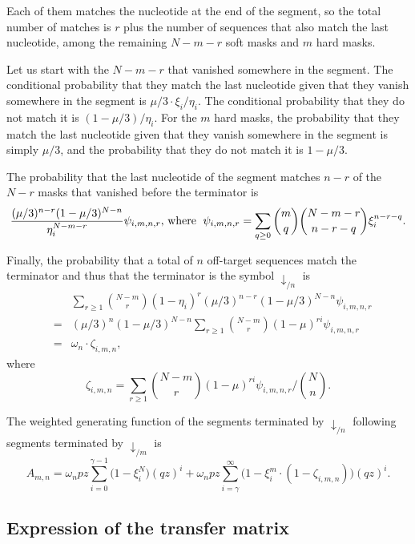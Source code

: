 \documentclass{article}
\begin{document}
Each of them matches the nucleotide at the end of the segment, so the
total number of matches is $r$ plus the number of sequences that also
match the last nucleotide, among the remaining $N-m-r$ soft masks and $m$
hard masks.

Let us start with the $N-m-r$ that vanished somewhere in the segment. The
conditional probability that they match the last nucleotide given that
they vanish somewhere in the segment is $\mu/3 \cdot \xi_i / \eta_i$. The
conditional probability that they do not match it is $(1-\mu/3) / \eta_i$.
For the $m$ hard masks, the probability that they match the last
nucleotide given that they vanish somewhere in the segment is simply
$\mu/3$, and the probability that they do not match it is $1-\mu/3$.

The probability that the last nucleotide of the segment matches $n-r$ of
the $N-r$ masks that vanished before the terminator is
\begin{equation*}
\frac{(\mu/3)^{n-r}(1-\mu/3)^{N-n}}{\eta_i^{N-m-r}}
\psi_{i,m,n,r}\text{, where \;}
\psi_{i,m,n,r} = \sum_{q \geq 0}{m \choose q}{N-m-r \choose n-r-q}
\xi_i^{n-r-q}.
\end{equation*}


Finally, the probability that a total of $n$ off-target sequences match
the terminator and thus that the terminator is the symbol
$\downarrow_{/n}$ is
\begin{eqnarray*}
&\;& \sum_{r\geq1} {N-m \choose r}
(1 - \eta_i)^r (\mu/3)^{n-r} (1-\mu/3)^{N-n} \psi_{i,m,n,r} \\
&=& (\mu/3)^n(1-\mu/3)^{N-n} \sum_{r\geq1} {N-m \choose r}
  (1 - \mu)^{ri} \psi_{i,m,n,r} \\
&=& \omega_n \cdot \zeta_{i,m,n},
\end{eqnarray*}
where
\begin{equation}
\label{eq:zeta}
\zeta_{i,m,n} = \sum_{r\geq1} {N-m \choose r}
(1-\mu)^{ri} \psi_{i,m,n,r} \bigg/ {N \choose n}.
\end{equation}


The weighted generating function of the segments terminated by
$\downarrow_{/n}$ following segments terminated by $\downarrow_{/m}$ is
\begin{equation}
\label{eq:A}
A_{m,n} =
\omega_n pz \sum_{i=0}^{\gamma-1} \Big(1 - \xi_i^N \Big) (qz)^i + \omega_n
pz \sum_{i=\gamma}^\infty \Big(1 - \xi_i^m \cdot
(1- \zeta_{i,m,n}) \Big) (qz)^i.
\end{equation}

\subsection{Expression of the transfer matrix}
\label{sec:expression_of_M}
\end{document}
